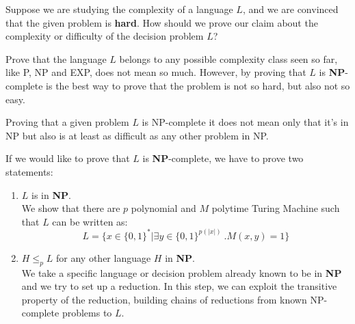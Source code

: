 Suppose we are studying the complexity of a language $L$, and we are convinced that the given problem is \textbf{hard}. How should we prove our claim about the 
complexity or difficulty of the decision problem $L$? \vspace{7pt}

Prove that the language $L$ belongs to any possible complexity class seen so far, like P, NP and EXP, does not mean so much. However, by proving that $L$ is
\textbf{NP}-complete is the best way to prove that the problem is not so hard, but also not so easy. \vspace{7pt}

Proving that a given problem $L$ is NP-complete it does not mean only that it's in NP but also is at least as difficult as any other problem in NP. \vspace{7pt}

If we would like to prove that $L$ is \textbf{NP}-complete, we have to prove two statements: 
\begin{enumerate}
    \item $L$ is in \textbf{NP}. \\
    We show that there are $p$ polynomial and $M$ polytime Turing Machine such that $L$ can be written as:
    $$L = \{x \in \{0,1\}^* | \exists y \in \{0,1\}^{p(|x|)} \ . M(x,y) = 1\}$$
    \item $H \leq_{p} L$ for any other language $H$ in \textbf{NP}. \\
    We take a specific language or decision problem already known to be in \textbf{NP} and we try to set up a reduction. In this step, we can exploit 
    the transitive property of the reduction, building chains of reductions from known NP-complete problems to $L$.
\end{enumerate}